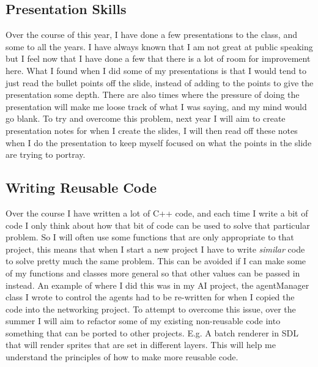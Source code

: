 \documentclass{scrartcl}
\begin{document}
\subsection{Presentation Skills}
Over the course of this year, I have done a few presentations to the class, and some to all the years. I have always known that I am not great at public speaking but I feel now that I have done a few that there is a lot of room for improvement here. What I found when I did some of my presentations is that I would tend to just read the bullet points off the slide, instead of adding to the points to give the presentation some depth. There are also times where the pressure of doing the presentation will make me loose track of what I was saying, and my mind would go blank.
To try and overcome this problem, next year I will aim to create presentation notes for when I create the slides, I will then read off these notes when I do the presentation to keep myself focused on what the points in the slide are trying to portray. 

\subsection{Writing Reusable Code}
Over the course I have written a lot of C++ code, and each time I write a bit of code I only think about how that bit of code can be used to solve that particular problem. So I will often use some functions that are only appropriate to that project, this means that when I start a new project I have to write \textit{similar} code to solve pretty much the same problem. This can be avoided if I can make some of my functions and classes more general so that other values can be passed in instead. An example of where I did this was in my AI project, the agentManager class I wrote to control the agents had to be re-written for when I copied the code into the networking project.
To attempt to overcome this issue, over the summer I will aim to refactor some of my existing non-reusable code into something that can be ported to other projects. E.g. A batch renderer in SDL that will render sprites that are set in different layers. This will help me understand the principles of how to make more reusable code.

\end{document}
